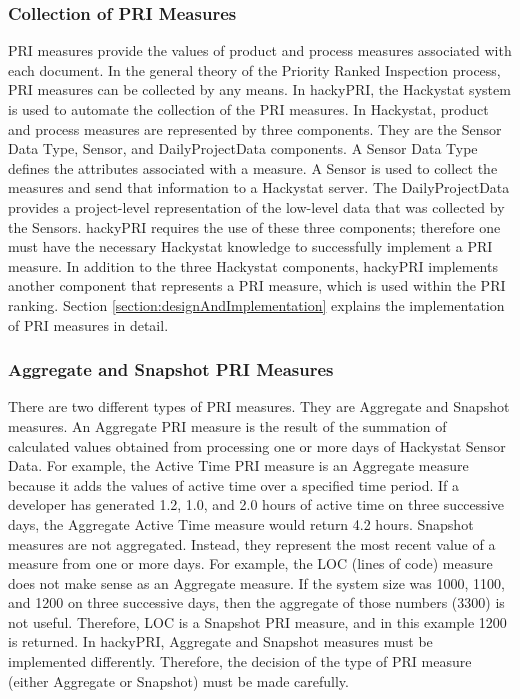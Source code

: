 \subsubsection{Collection of PRI Measures}
PRI measures provide the values of product and process measures associated
with each document. In the general theory of the Priority Ranked Inspection
process, PRI measures can be collected by any means. In hackyPRI, the
Hackystat system is used to automate the collection of the PRI measures. In
Hackystat, product and process measures are represented by three
components. They are the Sensor Data Type, Sensor, and DailyProjectData
components. A Sensor Data Type defines the attributes associated with a
measure. A Sensor is used to collect the measures and send that information
to a Hackystat server. The DailyProjectData provides a project-level
representation of the low-level data that was collected by the Sensors.
hackyPRI requires the use of these three components; therefore one must
have the necessary Hackystat knowledge to successfully implement a PRI
measure. In addition to the three Hackystat components, hackyPRI implements
another component that represents a PRI measure, which is used within the
PRI ranking. Section \ref{section:designAndImplementation} explains the
implementation of PRI measures in detail.

\subsubsection{Aggregate and Snapshot PRI Measures}
There are two different types of PRI measures. They are Aggregate and
Snapshot measures. An Aggregate PRI measure is the result of the summation
of calculated values obtained from processing one or more days of Hackystat
Sensor Data. For example, the Active Time PRI measure is an Aggregate
measure because it adds the values of active time over a specified time
period. If a developer has generated 1.2, 1.0, and 2.0 hours of active time
on three successive days, the Aggregate Active Time measure would return
4.2 hours. Snapshot measures are not aggregated. Instead, they represent
the most recent value of a measure from one or more days. For example, the
LOC (lines of code) measure does not make sense as an Aggregate measure.
If the system size was 1000, 1100, and 1200 on three successive days, then
the aggregate of those numbers (3300) is not useful. Therefore, LOC is a
Snapshot PRI measure, and in this example 1200 is returned. In hackyPRI,
Aggregate and Snapshot measures must be implemented differently. Therefore,
the decision of the type of PRI measure (either Aggregate or Snapshot) must
be made carefully.

